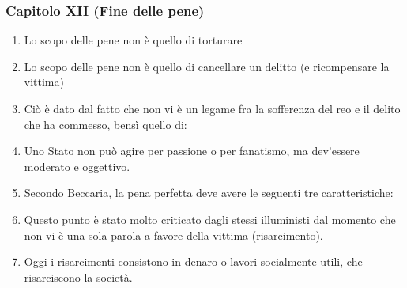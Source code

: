 \documentclass{article}
\begin{document}
\newpage
\subsubsection{Capitolo XII (Fine delle pene)}

\begin{enumerate}
    \item Lo scopo delle pene non è quello di torturare
    \item Lo scopo delle pene non è quello di cancellare un delitto (e ricompensare la vittima)
    \item Ciò è dato dal fatto che non vi è un legame fra la sofferenza del reo e il delito che ha commesso,
    bensì quello di:
    \item Uno Stato non può agire per passione o per fanatismo, ma dev’essere moderato e oggettivo.
    \item Secondo Beccaria, la pena perfetta deve avere le seguenti tre caratteristiche:
    \item Questo punto è stato molto criticato dagli stessi illuministi dal momento che non vi è una sola parola a
    favore della vittima (risarcimento).
    \item Oggi i risarcimenti consistono in denaro o lavori socialmente utili, che
    risarciscono la società.
\end{enumerate}

\phantom{}
\end{document}
